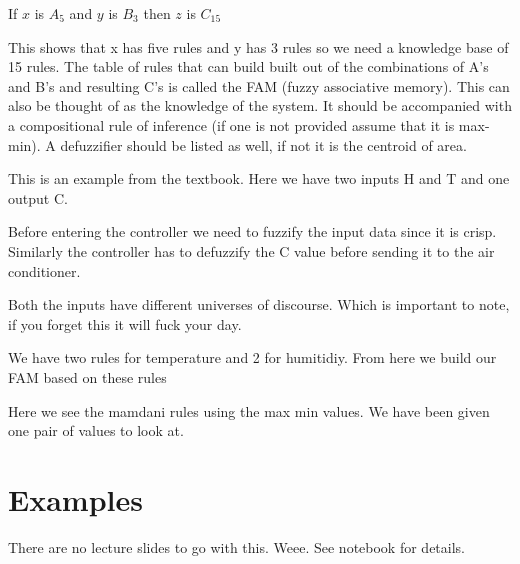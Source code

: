 \documentclass{article}
\begin{document}
If $x$ is $A_5$ and $y$ is $B_3$ then $z$ is $C_15$

This shows that x has five rules and y has 3 rules so we need a knowledge base of 15 rules. The table of rules that can build built out of the combinations of A's and B's and resulting C's is called the FAM (fuzzy associative memory). This can also be thought of as the knowledge of the system. It should be accompanied with a compositional rule of inference (if one is not provided assume that it is max-min). A defuzzifier should be listed as well, if not it is the centroid of area.


This is an example from the textbook. Here we have two inputs H and T and one output C.

Before entering the controller we need to fuzzify the input data since it is crisp. Similarly the controller has to defuzzify the C value before sending it to the air conditioner.


Both the inputs have different universes of discourse. Which is important to note, if you forget this it will fuck your day.


We have two rules for temperature and 2 for humitidiy. From here we build our FAM based on these rules


Here we see the mamdani rules using the max min values. We have been given one pair of values to look at.

\section*{Examples}
\label{sec:examples}
There are no lecture slides to go with this. Weee. See notebook for details.
\end{document}
